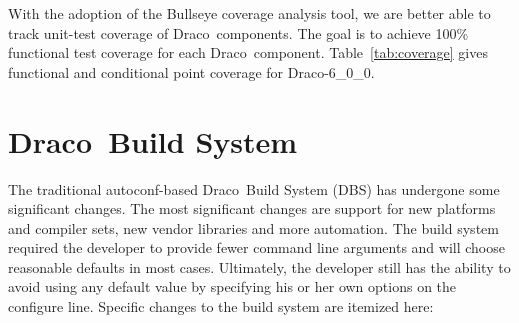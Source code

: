 \documentclass[note]{ResearchNote}
\newcommand{\draco}{Draco}
\newcommand{\dracor}{\draco-6\_0\_0}
\begin{document}
With the adoption of the \textsf{Bullseye} coverage analysis tool, we
are better able to track unit-test coverage of \draco\ components.
The goal is to achieve 100\% functional test coverage for each \draco\
component.  Table~\ref{tab:coverage} gives functional and conditional
point coverage for \dracor.



\section{\draco\ Build System}
\label{sec:dbs}

The traditional autoconf-based \draco\ Build System (DBS) has
undergone some significant changes.  The most significant changes are
support for new platforms and compiler sets, new vendor libraries and
more automation.  The build system required the developer to provide
fewer command line arguments and will choose reasonable defaults in
most cases.  Ultimately, the developer still has the ability to avoid
using any default value by specifying his or her own options on the
configure line.  Specific changes to the build system are itemized
here: 
\end{document}
